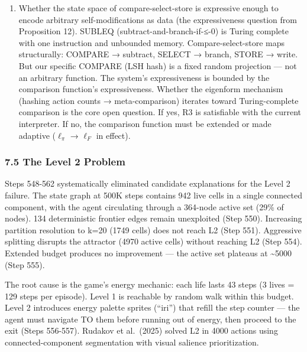 \documentclass[
  11pt,
]{article}
\begin{document}
\begin{enumerate}
  \textbf{Targeted π-refinement without foreknowledge (Proposition 15).}
  The POMDP reframing shows the bottleneck is hash resolution at
  critical cells (\(k_{n^*}\), the number of aliased hidden states at
  the exit node). Recode refines \(\pi\) from transition statistics but
  cannot identify WHICH cells are critical without environmental
  feedback. Whether an R1-compliant mechanism can achieve targeted
  \(\pi\)-refinement at the exit cell --- reducing \(k_{n^*}\) without
  knowing which cells are exit-adjacent --- connects to the belief-state
  literature (Kaelbling et al., 1998) and remains open.
\item
  Whether the state space of compare-select-store is expressive enough
  to encode arbitrary self-modifications as data (the expressiveness
  question from Proposition 12). SUBLEQ (subtract-and-branch-if-≤-0) is
  Turing complete with one instruction and unbounded memory.
  Compare-select-store maps structurally: COMPARE → subtract, SELECT →
  branch, STORE → write. But our specific COMPARE (LSH hash) is a fixed
  random projection --- not an arbitrary function. The system's
  expressiveness is bounded by the comparison function's expressiveness.
  Whether the eigenform mechanism (hashing action counts →
  meta-comparison) iterates toward Turing-complete comparison is the
  core open question. If yes, R3 is satisfiable with the current
  interpreter. If no, the comparison function must be extended or made
  adaptive (\(\ell_\pi\) → \(\ell_F\) in effect).
\end{enumerate}

\subsubsection{7.5 The Level 2 Problem}\label{the-level-2-problem}

Steps 548-562 systematically eliminated candidate explanations for the
Level 2 failure. The state graph at 500K steps contains 942 live cells
in a single connected component, with the agent circulating through a
364-node active set (29\% of nodes). 134 deterministic frontier edges
remain unexploited (Step 550). Increasing partition resolution to k=20
(1749 cells) does not reach L2 (Step 551). Aggressive splitting disrupts
the attractor (4970 active cells) without reaching L2 (Step 554).
Extended budget produces no improvement --- the active set plateaus at
\textasciitilde5000 (Step 555).

The root cause is the game's energy mechanic: each life lasts 43 steps
(3 lives = 129 steps per episode). Level 1 is reachable by random walk
within this budget. Level 2 introduces energy palette sprites (``iri'')
that refill the step counter --- the agent must navigate TO them before
running out of energy, then proceed to the exit (Steps 556-557). Rudakov
et al.~(2025) solved L2 in 4000 actions using connected-component
segmentation with visual salience prioritization.
\end{document}
